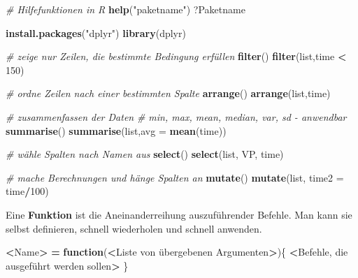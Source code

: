 \documentclass[]{book}
\newenvironment{Shaded}{\begin{snugshade}}{\end{snugshade}}
\newcommand{\KeywordTok}[1]{\textcolor[rgb]{0.13,0.29,0.53}{\textbf{#1}}}
\newcommand{\DataTypeTok}[1]{\textcolor[rgb]{0.13,0.29,0.53}{#1}}
\newcommand{\DecValTok}[1]{\textcolor[rgb]{0.00,0.00,0.81}{#1}}
\newcommand{\StringTok}[1]{\textcolor[rgb]{0.31,0.60,0.02}{#1}}
\newcommand{\CommentTok}[1]{\textcolor[rgb]{0.56,0.35,0.01}{\textit{#1}}}
\newcommand{\ControlFlowTok}[1]{\textcolor[rgb]{0.13,0.29,0.53}{\textbf{#1}}}
\newcommand{\OperatorTok}[1]{\textcolor[rgb]{0.81,0.36,0.00}{\textbf{#1}}}
\newcommand{\ErrorTok}[1]{\textcolor[rgb]{0.64,0.00,0.00}{\textbf{#1}}}
\newcommand{\NormalTok}[1]{#1}
\begin{document}
\begin{Shaded}
\begin{Highlighting}[]
\CommentTok{# Hilfefunktionen in R}
\KeywordTok{help}\NormalTok{(}\StringTok{"paketname"}\NormalTok{)}
\NormalTok{?Paketname}
\end{Highlighting}
\end{Shaded}

\begin{Shaded}
\begin{Highlighting}[]
\KeywordTok{install.packages}\NormalTok{(}\StringTok{"dplyr"}\NormalTok{)}
\KeywordTok{library}\NormalTok{(dplyr)}

\CommentTok{# zeige nur Zeilen, die bestimmte Bedingung erfüllen}
\KeywordTok{filter}\NormalTok{()}
\KeywordTok{filter}\NormalTok{(list,time }\OperatorTok{<}\StringTok{ }\DecValTok{150}\NormalTok{)}

\CommentTok{# ordne Zeilen nach einer bestimmten Spalte}
\KeywordTok{arrange}\NormalTok{()}
\KeywordTok{arrange}\NormalTok{(list,time)}
\end{Highlighting}
\end{Shaded}

\begin{Shaded}
\begin{Highlighting}[]
\CommentTok{# zusammenfassen der Daten}
\CommentTok{# min, max, mean, median, var, sd - anwendbar}
\KeywordTok{summarise}\NormalTok{()}
\KeywordTok{summarise}\NormalTok{(list,}\DataTypeTok{avg =} \KeywordTok{mean}\NormalTok{(time))}

\CommentTok{# wähle Spalten nach Namen aus}
\KeywordTok{select}\NormalTok{()}
\KeywordTok{select}\NormalTok{(list, VP, time)}

\CommentTok{# mache Berechnungen und hänge Spalten an}
\KeywordTok{mutate}\NormalTok{()}
\KeywordTok{mutate}\NormalTok{(list, }\DataTypeTok{time2 =}\NormalTok{ time}\OperatorTok{/}\DecValTok{100}\NormalTok{)}
\end{Highlighting}
\end{Shaded}

Eine \textbf{Funktion} ist die Aneinanderreihung auszuführender Befehle.
Man kann sie selbst definieren, schnell wiederholen und schnell
anwenden.

\begin{Shaded}
\begin{Highlighting}[]
\OperatorTok{<}\NormalTok{Name}\OperatorTok{>}\StringTok{ }\ErrorTok{=}\StringTok{ }\ControlFlowTok{function}\NormalTok{(}\OperatorTok{<}\NormalTok{Liste von übergebenen Argumenten}\OperatorTok{>}\NormalTok{)\{}
  \OperatorTok{<}\NormalTok{Befehle, die ausgeführt werden sollen}\OperatorTok{>}
\NormalTok{\}}
\end{Highlighting}
\end{Shaded}
\end{document}
